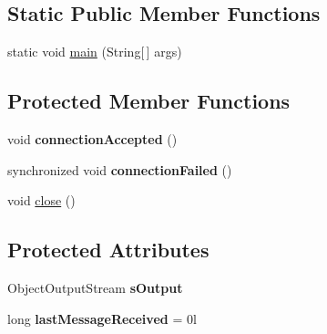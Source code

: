 \begin{DoxyCompactItemize}
\end{DoxyCompactItemize}
\subsection*{Static Public Member Functions}
\begin{DoxyCompactItemize}
\item 
static void \hyperlink{classgov_1_1fnal_1_1ppd_1_1dd_1_1chat_1_1MessagingClient_aecbd81343fff7acb75d14ba29c973ed3}{main} (String\mbox{[}$\,$\mbox{]} args)
\end{DoxyCompactItemize}
\subsection*{Protected Member Functions}
\begin{DoxyCompactItemize}
\item 
\hypertarget{classgov_1_1fnal_1_1ppd_1_1dd_1_1chat_1_1MessagingClient_ae7a2a256431770ac9b0f06d444aa636e}{void {\bfseries connection\-Accepted} ()}\label{classgov_1_1fnal_1_1ppd_1_1dd_1_1chat_1_1MessagingClient_ae7a2a256431770ac9b0f06d444aa636e}

\item 
\hypertarget{classgov_1_1fnal_1_1ppd_1_1dd_1_1chat_1_1MessagingClient_ab42c0b4f0a822c6d2612f1121698ae01}{synchronized void {\bfseries connection\-Failed} ()}\label{classgov_1_1fnal_1_1ppd_1_1dd_1_1chat_1_1MessagingClient_ab42c0b4f0a822c6d2612f1121698ae01}

\item 
void \hyperlink{classgov_1_1fnal_1_1ppd_1_1dd_1_1chat_1_1MessagingClient_a701c9889979e93718a0066cb45f063bb}{close} ()
\end{DoxyCompactItemize}
\subsection*{Protected Attributes}
\begin{DoxyCompactItemize}
\item 
\hypertarget{classgov_1_1fnal_1_1ppd_1_1dd_1_1chat_1_1MessagingClient_aa73e6484782a706430ae2e4d04d67cb0}{Object\-Output\-Stream {\bfseries s\-Output}}\label{classgov_1_1fnal_1_1ppd_1_1dd_1_1chat_1_1MessagingClient_aa73e6484782a706430ae2e4d04d67cb0}

\item 
\hypertarget{classgov_1_1fnal_1_1ppd_1_1dd_1_1chat_1_1MessagingClient_a5a6bddbcf19712e979b10e3f122c29bc}{long {\bfseries last\-Message\-Received} = 0l}\label{classgov_1_1fnal_1_1ppd_1_1dd_1_1chat_1_1MessagingClient_a5a6bddbcf19712e979b10e3f122c29bc}

\end{DoxyCompactItemize}


